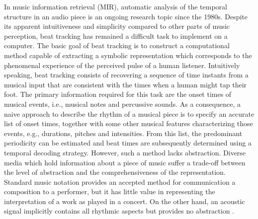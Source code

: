 \documentclass{scrartcl}
\begin{document}
In music information retrieval (MIR), automatic analysis of the temporal structure in an audio piece is an ongoing research topic since the 1980s. Despite its apparent intuitiveness and simplicity compared to other parts of music perception, beat tracking has remained a difficult task to implement on a computer. The basic goal of beat tracking is to construct a computational method capable of extracting a symbolic representation which corresponds to the phenomenal experience of the perceived pulse of a human listener. Intuitively speaking, beat tracking consists of recovering a sequence of time instants from a musical input that are consistent with the times when a human might tap their foot. The primary information required for this task are the onset times of musical events, i.e., musical notes and percussive sounds. As a consequence, a naive approach to describe the rhythm of a musical piece is to specify an accurate list of onset times, together with some other musical features characterizing those events, e.g., durations, pitches and intensities. From this list, the predominant periodicity can be estimated and beat times are subsequently determined using a temporal decoding strategy. However, such a method lacks abstraction. Diverse media which hold information about a piece of music suffer a trade-off between the level of abstraction and the comprehensiveness of the representation. Standard music notation provides an accepted method for communication a composition to a performer, but it has little value in representing the interpretation of a work as played in a concert. On the other hand, an acoustic signal implicitly contains all rhythmic aspects but provides no abstraction \cite{Gouyon2005}.

\end{document}

